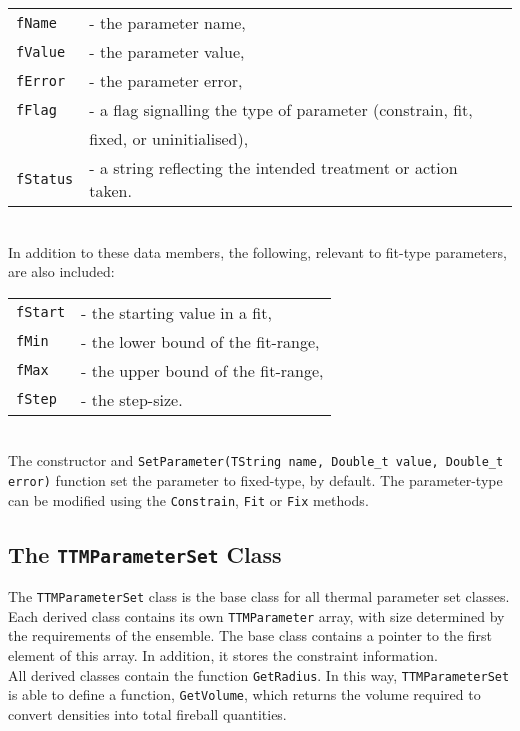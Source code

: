 \documentclass{elsarticle}
\begin{document}
\begin{tabular}{ll}
\texttt{fName} &- the parameter name,\\
\texttt{fValue} &- the parameter value,\\
\texttt{fError} &- the parameter error,\\
\texttt{fFlag} &- a flag signalling the type of parameter (constrain, fit,\\
               &  fixed, or uninitialised),\\
\texttt{fStatus} &- a string reflecting the intended treatment or action taken.
\end{tabular}\\

\noindent
In addition to these data members, the following, relevant to fit-type parameters, are also included:\\

\begin{tabular}{ll}
\texttt{fStart} &- the starting value in a fit,\\
\texttt{fMin} &- the lower bound of the fit-range,\\
\texttt{fMax} &- the upper bound of the fit-range,\\
\texttt{fStep} &- the step-size.
\end{tabular}\\

\noindent
The constructor and \texttt{SetParameter(TString name, Double\_t value, Double\_t error)} function set the parameter 
to fixed-type, by default. The parameter-type can be modified using the \texttt{Constrain}, 
\texttt{Fit} or \texttt{Fix} methods.

\subsection{The \texttt{TTMParameterSet} Class}
 
The \texttt{TTMParameterSet} class is the base class for all thermal parameter set 
classes. Each derived class contains its own \texttt{TTMParameter} array, with size determined 
by the requirements of the ensemble. The base class contains a pointer to 
the first element of this array. In addition, it stores the constraint 
information.\\

All derived classes contain the function 
\texttt{GetRadius}. In this way, \texttt{TTMParameterSet} is able to define a function, \texttt{GetVolume}, 
which returns the volume required to convert densities into total fireball quantities.\\
 
\end{document}
